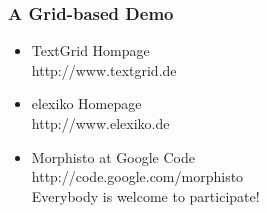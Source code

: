 \documentclass {beamer}
\begin{document}
\frame
{  \frametitle{A Grid-based Demo}
\begin{itemize}
\item{TextGrid Hompage \\ http://www.textgrid.de}
\item{elexiko Homepage \\ http://www.elexiko.de}
\item{Morphisto at Google Code \\ http://code.google.com/morphisto \\
Everybody is welcome to participate!}
\end{itemize}
}
\end{document}
